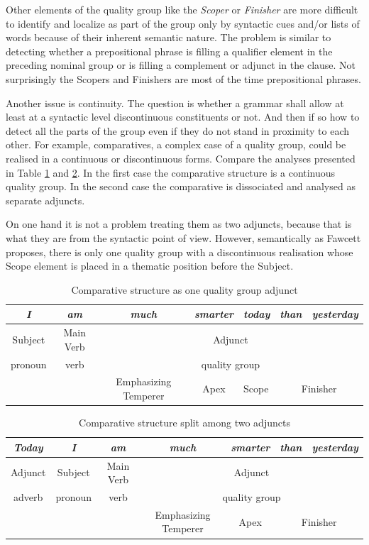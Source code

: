     Other elements of the quality group like the \textit{Scoper} or \textit{Finisher} are more difficult to identify and localize as part of the group only by syntactic cues and/or lists of words because of their inherent semantic nature. The problem is similar to detecting whether a prepositional phrase is filling a qualifier element in the preceding nominal group or is filling a complement or adjunct in the clause. Not surprisingly the Scopers and Finishers are most of the time prepositional phrases. 
	
	Another issue is continuity. The question is whether a grammar shall allow at least at a syntactic level discontinuous constituents or not. And then if so how to detect all the parts of the group even if they do not stand in proximity to each other. For example, comparatives, a complex case of a quality group, could be realised in a continuous or discontinuous forms. Compare the analyses presented in Table \ref{tab:csgq1} and \ref{tab:csgq2}. In the first case the comparative structure is a continuous quality group. In the second case the comparative is dissociated and analysed as separate adjuncts. 
	
	On one hand it is not a problem treating them as two adjuncts, because that is what they are from the syntactic point of view. However, semantically as Fawcett proposes, there is only one quality group with a discontinuous realisation whose Scope element is placed in a thematic position before the Subject. 
    
	\begin{table}[H]
		\centering
		\begin{tabular}{|c|c|c|c|l|c|c|}
			\hline
			\textit{I} & \textit{am} & \textit{much} & \textit{smarter} & \textit{today} & \textit{than} & \textit{yesterday} \\ \hline
			Subject & Main Verb & \multicolumn{5}{c|}{Adjunct} \\ \hline
			pronoun & verb & \multicolumn{5}{c|}{quality group} \\ \hline
			&  & Emphasizing Temperer & Apex & Scope & \multicolumn{2}{c|}{Finisher} \\ \hline
		\end{tabular}
		\caption{Comparative structure as one quality group adjunct}
		\label{tab:csgq1}
	\end{table}
	\begin{table}[H]
		\centering
		\begin{tabular}{|c|c|c|c|c|c|c|}
			\hline
			\textit{Today} & \textit{I} & \textit{am} & \textit{much} & \textit{smarter} & \textit{than} & \textit{yesterday} \\ \hline
			Adjunct & Subject & Main Verb & \multicolumn{4}{c|}{Adjunct} \\ \hline
			adverb & pronoun & verb & \multicolumn{4}{c|}{quality group} \\ \hline
			&  &  & Emphasizing Temperer & Apex & \multicolumn{2}{c|}{Finisher} \\ \hline
		\end{tabular}
		\caption{Comparative structure split among two adjuncts}
		\label{tab:csgq2}
	\end{table}
    

